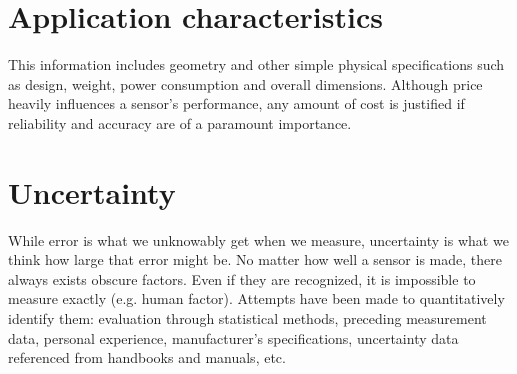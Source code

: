 \section{Application characteristics}
This information includes geometry and other simple physical specifications such as design, weight, power consumption and overall dimensions. Although price heavily influences a sensor's performance, any amount of cost is justified if reliability and accuracy are of a paramount importance.
\section{Uncertainty}
While error is what we unknowably get when we measure, uncertainty is what we think how large that error might be. No matter how well a sensor is made, there always exists obscure factors. Even if they are recognized, it is impossible to measure exactly (e.g. human factor). Attempts have been made to quantitatively identify them: evaluation through statistical methods, preceding measurement data, personal experience, manufacturer's specifications, uncertainty data referenced from handbooks and manuals, etc.
